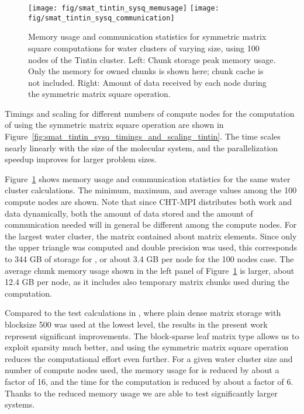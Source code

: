 \documentclass{elsarticle}
\begin{document}
\begin{figure}
  \begin{center}
    \texttt{[image: fig/smat\_tintin\_sysq\_memusage]}
    \texttt{[image: fig/smat\_tintin\_sysq\_communication]}
  \end{center}
  \caption{Memory usage and communication statistics for  symmetric matrix square computations
    for water clusters of varying size, using 100 nodes of
    the Tintin cluster. Left: Chunk storage peak memory usage. Only
    the memory for owned chunks is shown here; chunk cache is not
    included.  Right: Amount of data received by each node during the
    symmetric matrix square operation.
    \label{fig:smat_tintin_sysq_memusage_mm}}
\end{figure}

Timings and scaling for different numbers of compute nodes for the
computation of  using the symmetric matrix square operation are shown
in Figure~\ref{fig:smat_tintin_sysq_timings_and_scaling_tintin}.
The time scales nearly linearly with the size of the
molecular system, and the parallelization speedup improves for larger
problem sizes.

Figure~\ref{fig:smat_tintin_sysq_memusage_mm} shows memory usage and
communication statistics for the same water cluster 
calculations. The minimum, maximum, and average values among the 100
compute nodes are shown. Note that since CHT-MPI distributes both work
and data dynamically, both the amount of data stored and the amount of
communication needed will in general be different among the compute nodes.
For the largest water cluster, the 
matrix contained about  matrix elements. Since only the
upper triangle was computed and double precision was used, this
corresponds to 344 GB of storage for , or about 3.4 GB per node
for the 100 nodes case. The average chunk memory usage shown in the
left panel of Figure~\ref{fig:smat_tintin_sysq_memusage_mm} is larger,
about 12.4 GB per node, as it includes also temporary matrix chunks
used during the computation.

Compared to the  test calculations in
\cite{chunks-and-tasks}, where plain dense matrix storage with
blocksize 500 was used at the lowest level, the results in the present
work
represent significant improvements. The block-sparse leaf matrix type
allows us to exploit sparsity much better, and using the symmetric
matrix square operation reduces the computational effort even further.
For a given water cluster size and number of compute nodes used, the
memory usage for  is reduced by about a factor of 16, and the 
time for the  computation is reduced by about a factor of 6.
Thanks to the reduced memory usage we are able to test significantly
larger systems.
\end{document}
